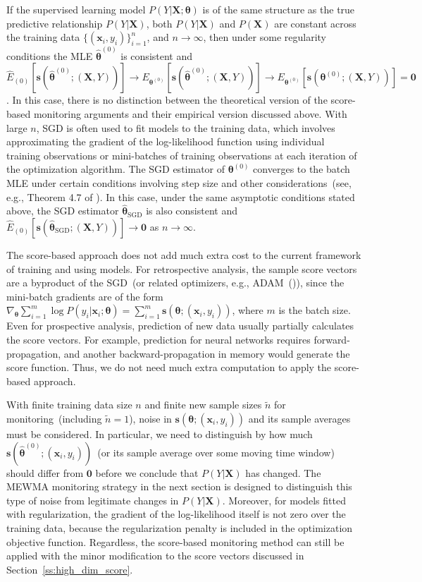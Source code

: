 \documentclass[twoside,11pt]{article}
\begin{document}
If the supervised learning model $P(Y|\bm{X};\bm{\theta})$ is of the same structure as the true predictive relationship $P(Y|\bm{X})$, both $P(Y|\bm{X})$ and $P(\bm{X})$ are constant across the training data $\{(\bm{x}_i, y_i)\}_{i=1}^n$, and $n \to \infty$, then under some regularity conditions the MLE $\hat{\bm { \theta}} ^{ (0)}$ is consistent and  $\hat{E}_{(0)} [\bm{s}(\hat{\bm { \theta}} ^{ (0)};(\bm {X}, Y))] \to E_{\bm { \theta} ^{ (0)}}[\bm{s}(\hat{\bm { \theta}} ^{ (0)};(\bm {X}, Y))] \to E_{\bm { \theta} ^{ (0)}}[\bm{s}(\bm { \theta} ^{ (0)};(\bm {X}, Y))] = \bm {0}$. In this case, there is no distinction between the theoretical version of the score-based monitoring arguments and their empirical version discussed above. With large $n$, SGD is often used to fit models to the training data, which involves approximating the gradient of the log-likelihood function using individual training observations or mini-batches of training observations at each iteration of the optimization algorithm. The SGD estimator of $\bm { \theta} ^{ (0)}$ converges to the batch MLE under certain conditions involving step size and other considerations~(see, e.g., Theorem 4.7 of \cite{bottou2018optimization}). In this case, under the same asymptotic conditions stated above, the SGD estimator $\hat {\bm { \theta}}_{\mathrm{SGD}}$ is also consistent and $\hat{E}_{(0)} [\bm{s}(\hat{\bm { \theta}}_{\mathrm{SGD}};(\bm {X}, Y))] \to \bm{0}$ as $n \to \infty$. 

The score-based approach does not add much extra cost to the current framework of training and using models. For retrospective analysis, the sample score vectors are a byproduct of the SGD~(or related optimizers, e.g., ADAM~(\cite{kingma2014adam})), since the mini-batch gradients are of the form $\nabla _{\bm { \theta}} \sum _{i=1} ^{m} \log{P(y_i|\bm {x}_i;\bm{\theta})} = \sum _{i=1} ^{m} \bm{s}(\bm { \theta};(\bm {x}_i, y_i))$, where $m$ is the batch size. Even for prospective analysis, prediction of new data usually partially calculates the score vectors. For example, prediction for neural networks requires forward-propagation, and another backward-propagation in memory would generate the score function. Thus, we do not need much extra computation to apply the score-based approach.

With finite training data size $n$ and finite new sample sizes $\tilde{n}$ for monitoring~(including $\tilde{n}=1$), noise in $\bm{s}(\bm { \theta};(\bm {x}_i, y_i))$ and its sample averages must be considered. In particular, we need to distinguish by how much $\bm{s}(\hat{\bm { \theta}}^{(0)};(\bm {x}_i, y_i))$~(or its sample average over some moving time window) should differ from $\bm{0}$ before we conclude that $P(Y|\bm{X})$ has changed. The MEWMA monitoring strategy in the next section is designed to distinguish this type of noise from legitimate changes in $P(Y|\bm{X})$. Moreover, for models fitted with regularization, the gradient of the log-likelihood itself is not zero over the training data, because the regularization penalty is included in the optimization objective function. Regardless, the score-based monitoring method can still be applied with the minor modification to the score vectors discussed in Section~\ref{ss:high_dim_score}.
\end{document}
